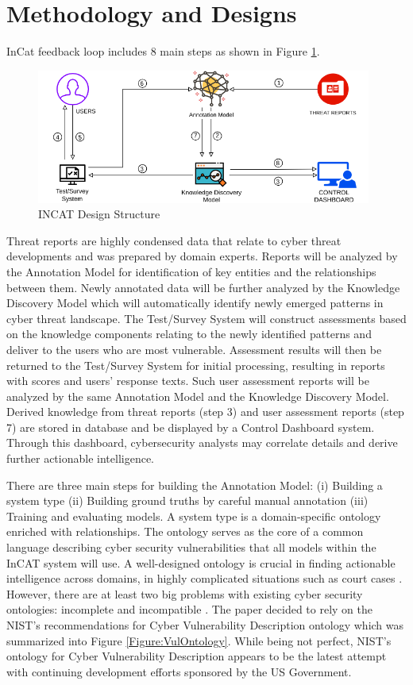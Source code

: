 \documentclass{article} %
\begin{document}
\section{Methodology and Designs}
InCat feedback loop includes 8 main steps as shown in Figure \ref{Figure:IncatDesign}. 

\begin{figure}[h]
  \centering
  \includegraphics[width=11cm]{images/INCAT-Designs.png}
  \caption{INCAT Design Structure}
  \label{Figure:IncatDesign}
\end{figure}

Threat reports are highly condensed data that relate to cyber threat developments and was prepared by domain experts. Reports will be analyzed by the Annotation Model for identification of key entities and the relationships between them. Newly annotated data will be further analyzed by the Knowledge Discovery Model which will automatically identify newly emerged patterns in cyber threat landscape. The Test/Survey System will construct assessments based on the knowledge components relating to the newly identified patterns and deliver to the users who are most vulnerable. Assessment results will then be returned to the Test/Survey System for initial processing, resulting in reports with scores and users' response texts. Such user assessment reports will be analyzed by the same Annotation Model and the Knowledge Discovery Model. Derived knowledge from threat reports (step 3) and user assessment reports (step 7) are stored in database and be displayed by a Control Dashboard system. Through this dashboard, cybersecurity analysts may correlate details and derive further actionable intelligence.

There are three main steps for building the Annotation Model: (i) Building a system type (ii) Building ground truths by careful manual annotation (iii) Training and evaluating models. A system type is a domain-specific ontology enriched with relationships. The ontology serves as the core of a common language describing cyber security vulnerabilities that all models within the InCAT system will use. A well-designed ontology is crucial in finding actionable intelligence across domains, in highly complicated situations such as court cases \cite{Michel2018CyberCybercrime}. However, there are at least two big problems with existing cyber security ontologies: incomplete and incompatible \cite{Mavroeidis2017CyberIntelligence}. The paper decided to rely on the NIST's recommendations for Cyber Vulnerability Description ontology \cite{Booth2016DraftOntology} which was summarized into Figure \ref{Figure:VulOntology}. While being not perfect, NIST's ontology for Cyber Vulnerability Description appears to be the latest attempt with continuing development efforts sponsored by the US Government.
\end{document}
